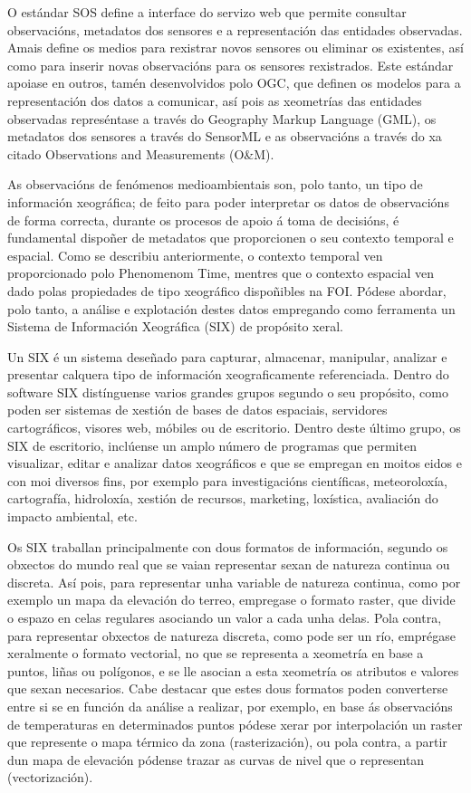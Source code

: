 O estándar SOS define a interface do servizo web que permite consultar observacións, metadatos dos sensores e a representación das entidades observadas. Amais define os medios para rexistrar novos sensores ou eliminar os existentes, así como para inserir novas observacións para os sensores rexistrados. Este estándar apoiase en outros, tamén desenvolvidos polo OGC, que definen os modelos para a representación dos datos a comunicar, así pois as xeometrías das entidades observadas represéntase a través do Geography Markup Language (GML), os metadatos dos sensores a través do SensorML e as observacións a través do xa citado Observations and Measurements (O\&M).

As observacións de fenómenos medioambientais son, polo tanto, un tipo de información xeográfica; de feito para poder interpretar os datos de observacións de forma correcta, durante os procesos de apoio á toma de decisións, é fundamental dispoñer de metadatos que proporcionen o seu contexto temporal e espacial. Como se describiu anteriormente, o contexto temporal ven proporcionado polo Phenomenom Time, mentres que o contexto espacial ven dado polas propiedades de tipo xeográfico dispoñibles na FOI. Pódese abordar, polo tanto, a análise e explotación destes datos empregando como ferramenta un Sistema de Información Xeográfica (SIX) de propósito xeral.

Un SIX é un sistema deseñado para capturar, almacenar, manipular, analizar e presentar calquera tipo de información xeograficamente referenciada. Dentro do software SIX distínguense varios grandes grupos segundo o seu propósito, como poden ser sistemas de xestión de bases de datos espaciais, servidores cartográficos, visores web, móbiles ou de escritorio. Dentro deste último grupo, os SIX de escritorio, inclúense un amplo número de programas que permiten visualizar, editar e analizar datos xeográficos e que se empregan en moitos eidos e con moi diversos fins, por exemplo para investigacións científicas, meteoroloxía, cartografía, hidroloxía, xestión de recursos, marketing, loxística, avaliación do impacto ambiental, etc.

Os SIX traballan principalmente con dous formatos de información, segundo os obxectos do mundo real que se vaian representar sexan de natureza continua ou discreta. Así pois, para representar unha variable de natureza continua, como por exemplo un mapa da elevación do terreo, empregase o formato raster, que divide o espazo en celas regulares asociando un valor a cada unha delas. Pola contra, para representar obxectos de natureza discreta, como pode ser un río, emprégase xeralmente o formato vectorial, no que se representa a xeometría en base a puntos, liñas ou polígonos, e se lle asocian a esta xeometría os atributos e valores que sexan necesarios. Cabe destacar que estes dous formatos poden converterse entre si se en función da análise a realizar, por exemplo, en base ás observacións de temperaturas en determinados puntos pódese xerar por interpolación un raster que represente o mapa térmico da zona (rasterización), ou pola contra, a partir dun mapa de elevación pódense trazar as curvas de nivel que o representan (vectorización).

